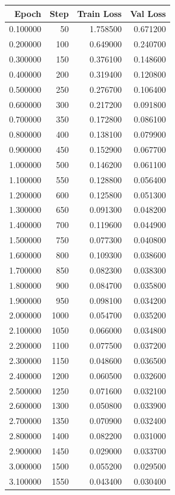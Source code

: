 \begin{tabular}{rrrr}
\toprule
Epoch & Step & Train Loss & Val Loss \\
\midrule
0.100000 & 50 & 1.758500 & 0.671200 \\
0.200000 & 100 & 0.649000 & 0.240700 \\
0.300000 & 150 & 0.376100 & 0.148600 \\
0.400000 & 200 & 0.319400 & 0.120800 \\
0.500000 & 250 & 0.276700 & 0.106400 \\
0.600000 & 300 & 0.217200 & 0.091800 \\
0.700000 & 350 & 0.172800 & 0.086100 \\
0.800000 & 400 & 0.138100 & 0.079900 \\
0.900000 & 450 & 0.152900 & 0.067700 \\
1.000000 & 500 & 0.146200 & 0.061100 \\
1.100000 & 550 & 0.128800 & 0.056400 \\
1.200000 & 600 & 0.125800 & 0.051300 \\
1.300000 & 650 & 0.091300 & 0.048200 \\
1.400000 & 700 & 0.119600 & 0.044900 \\
1.500000 & 750 & 0.077300 & 0.040800 \\
1.600000 & 800 & 0.109300 & 0.038600 \\
1.700000 & 850 & 0.082300 & 0.038300 \\
1.800000 & 900 & 0.084700 & 0.035800 \\
1.900000 & 950 & 0.098100 & 0.034200 \\
2.000000 & 1000 & 0.054700 & 0.035200 \\
2.100000 & 1050 & 0.066000 & 0.034800 \\
2.200000 & 1100 & 0.077500 & 0.037200 \\
2.300000 & 1150 & 0.048600 & 0.036500 \\
2.400000 & 1200 & 0.060500 & 0.032600 \\
2.500000 & 1250 & 0.071600 & 0.032100 \\
2.600000 & 1300 & 0.050800 & 0.033900 \\
2.700000 & 1350 & 0.070900 & 0.032400 \\
2.800000 & 1400 & 0.082200 & 0.031000 \\
2.900000 & 1450 & 0.029000 & 0.033700 \\
3.000000 & 1500 & 0.055200 & 0.029500 \\
3.100000 & 1550 & 0.043400 & 0.030400 \\

\end{tabular}
